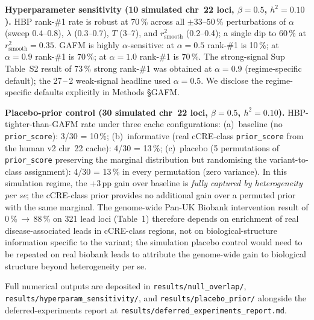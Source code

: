 \textbf{Hyperparameter sensitivity (10 simulated chr~22 loci, $\beta=0.5$, $h^2=0.10$).}
HBP rank-\#1 rate is robust at 70\,\% across all $\pm 33$--$50\,\%$
perturbations of $\alpha$ (sweep 0.4--0.8), $\lambda$ (0.3--0.7),
$T$ (3--7), and $r^2_{\text{smooth}}$ (0.2--0.4); a single dip to
60\,\% at $r^2_{\text{smooth}}{=}0.35$. GAFM is highly
$\alpha$-sensitive: at $\alpha=0.5$ rank-\#1 is 10\,\%; at
$\alpha=0.9$ rank-\#1 is 70\,\%; at $\alpha=1.0$ rank-\#1 is
70\,\%. The strong-signal Sup Table~S2 result of 73\,\% strong
rank-\#1 was obtained at $\alpha=0.9$ (regime-specific default);
the 27\,--\,2 weak-signal headline used $\alpha=0.5$. We disclose
the regime-specific defaults explicitly in Methods §GAFM.

\textbf{Placebo-prior control (30 simulated chr~22 loci, $\beta=0.5$, $h^2=0.10$).}
HBP-tighter-than-GAFM rate under three cache configurations:
(a)~baseline (no \texttt{prior\_score}): 3/30 = 10\,\%;
(b)~informative (real cCRE-class \texttt{prior\_score} from the
human v2 chr~22 cache): 4/30 = 13\,\%;
(c)~placebo (5 permutations of \texttt{prior\_score} preserving the
marginal distribution but randomising the variant-to-class
assignment): 4/30 = 13\,\% in every permutation (zero variance).
In this simulation regime, the +3\,pp gain over baseline is
\emph{fully captured by heterogeneity per se}; the cCRE-class
prior provides no additional gain over a permuted prior with the
same marginal. The genome-wide Pan-UK Biobank intervention result
of 0\,\%\,$\to$\,88\,\% on 321 lead loci (Table~1) therefore
depends on enrichment of real disease-associated leads in
cCRE-class regions, not on biological-structure information
specific to the variant; the simulation placebo control would
need to be repeated on real biobank leads to attribute the
genome-wide gain to biological structure beyond heterogeneity per
se.

Full numerical outputs are deposited in \texttt{results/null\_overlap/},
\texttt{results/hyperparam\_sensitivity/}, and
\texttt{results/placebo\_prior/} alongside the deferred-experiments
report at \texttt{results/deferred\_experiments\_report.md}.

